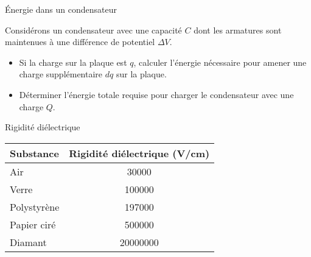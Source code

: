 \documentclass{beamer}
\begin{document}
\begin{frame}[t]{Énergie dans un condensateur}

Considérons un condensateur avec une capacité $C$ dont les armatures sont
maintenues à une différence de potentiel $\Delta V$.

\begin{itemize}
  \item Si la charge sur la plaque est $q$, calculer l'énergie nécessaire pour
    amener une charge supplémentaire $dq$ sur la plaque.
  \item Déterminer l'énergie totale requise pour charger le condensateur avec
    une charge $Q$.
\end{itemize}

\end{frame}



\begin{frame}{Rigidité diélectrique}

\begin{center}
\begin{tabular}{lS}
  \toprule
  Substance       &        {Rigidité diélectrique (\si{V/cm})}     \\
  \midrule
  Air             &  30000  \\
  Verre           &  100000 \\
  Polystyrène     &  197000 \\
  Papier ciré     &  500000 \\
  Diamant         &  20000000 \\
  \bottomrule
\end{tabular}
\end{center}
\end{frame}
\end{document}
